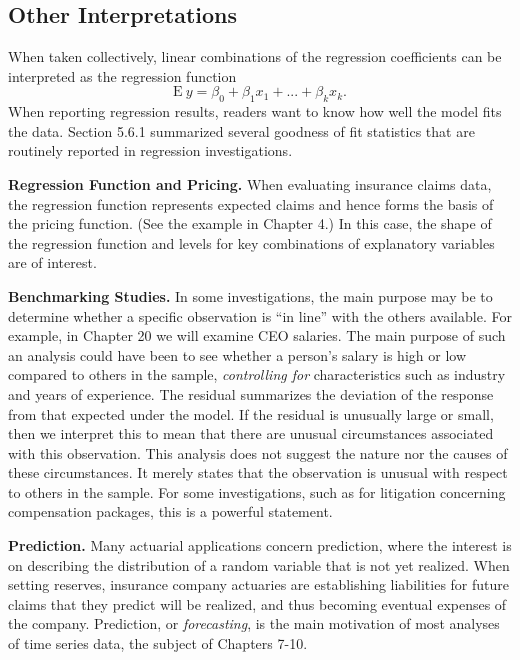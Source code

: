 \subsection{Other Interpretations}

When taken collectively, linear combinations of the regression
coefficients can be interpreted as the regression function
\begin{equation*}
\mathrm{E~}y = \beta_0 + \beta_1 x_1 +...+\beta _k x_k.
\end{equation*}
When reporting regression results, readers want to know how well the
model fits the data. Section 5.6.1 summarized several goodness of
fit statistics that are routinely reported in regression
investigations.

\noindent \textbf{Regression Function and Pricing.} When evaluating
insurance claims data, the regression function represents expected
claims and hence forms the basis of the pricing function. (See the
example in Chapter 4.) In this case, the shape of the regression
function and levels for key combinations of explanatory variables
are of interest.

\noindent \textbf{Benchmarking Studies.} In some investigations, the
main purpose may be to determine whether a specific observation is
``in line'' with the others available. For example, in Chapter 20 we
will examine CEO salaries. The main purpose of such an analysis
could have been to see whether a person's salary is high or low
compared to others in the sample, \emph{controlling for}
characteristics such as industry and years of experience. The
residual summarizes the deviation of the response from that expected
under the model. If the residual is unusually large or small, then
we interpret this to mean that there are unusual circumstances
associated with this observation. This analysis does not suggest the
nature nor the causes of these circumstances. It merely states that
the observation is unusual with respect to others in the sample. For
some investigations, such as for litigation concerning compensation
packages, this is a powerful statement.

\noindent \textbf{Prediction.} Many actuarial applications concern
prediction, where the interest is on describing the distribution of
a random variable that is not yet realized. When setting reserves,
insurance company actuaries are establishing liabilities for future
claims that they predict will be realized, and thus becoming
eventual expenses of the company. Prediction, or
\textit{forecasting}, is the main motivation of most analyses of
time series data, the subject of Chapters 7-10.

